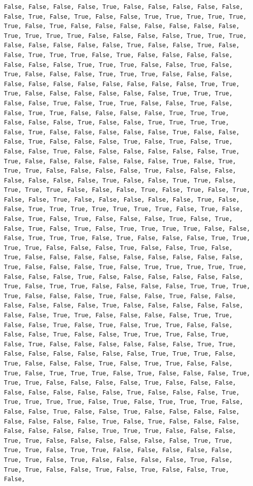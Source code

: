 \documentclass[
  letterpaper,
  DIV=11,
  numbers=noendperiod]{scrartcl}
\begin{document}
\begin{verbatim}
False, False, False, False, True, False, False, False, False, False, False, True, False, True, False, False, True, True, True, True, True, True, False, True, False, False, False, False, False, False, False, True, True, True, True, False, False, False, False, True, True, True, False, False, False, False, False, True, False, False, True, False, False, True, True, True, False, True, False, False, False, False, False, False, False, True, True, True, False, False, True, False, True, False, False, False, True, True, True, False, False, False, False, False, False, False, False, False, False, False, True, True, True, False, False, False, False, False, False, True, True, True, False, False, True, False, True, True, False, False, True, False, False, True, True, False, False, False, False, True, True, True, False, False, False, True, False, False, True, True, True, True, False, True, False, False, False, False, False, True, False, False, False, True, False, False, False, True, False, True, False, True, False, False, True, False, False, False, False, False, False, True, True, False, False, False, False, False, False, True, False, True, True, True, False, False, False, False, True, False, False, False, False, False, False, False, True, False, False, True, True, False, True, True, True, False, False, False, True, False, True, False, True, False, False, True, False, False, False, False, False, True, False, False, True, True, True, True, True, True, True, False, True, False, False, True, False, True, False, False, False, True, False, True, False, True, False, True, False, True, True, True, True, False, False, False, True, True, True, False, True, False, False, False, True, True, True, True, False, False, False, True, False, False, True, False, True, False, False, False, False, False, False, False, False, False, True, False, False, False, True, False, True, True, True, True, True, False, False, False, True, False, False, False, False, False, False, True, False, True, True, False, False, False, False, True, True, True, True, False, False, False, True, False, False, True, False, False, False, False, False, False, True, False, False, False, False, False, False, False, True, True, False, False, False, False, True, True, False, False, True, False, True, False, True, True, False, False, False, False, True, False, False, True, True, True, False, True, False, True, False, False, False, False, False, False, True, True, False, False, False, False, False, False, True, True, True, False, True, False, False, False, True, False, True, True, False, False, True, False, True, True, True, False, True, False, False, False, True, True, True, False, False, False, False, True, False, False, False, False, False, False, False, False, True, False, False, False, True, True, True, True, True, False, True, False, True, True, True, False, False, False, True, False, False, True, False, False, False, False, False, False, False, False, True, False, True, False, False, False, False, False, False, False, True, True, True, False, False, False, True, True, False, False, False, False, False, False, True, True, True, True, False, True, True, False, False, False, False, False, True, True, False, True, False, False, False, False, True, False, True, True, False, False, True, False, True, False, False, True, False, 
\end{verbatim}
\end{document}
